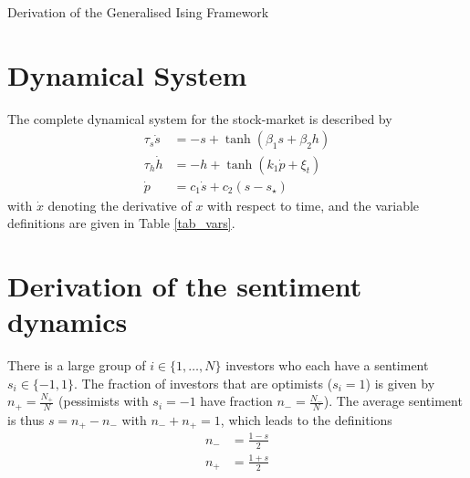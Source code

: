 \documentclass[11pt]{article}
\begin{document}
\begin{center}
\huge
Derivation of the Generalised Ising Framework
\end{center}

\section{Dynamical System}
The complete dynamical system for the stock-market is described by
\begin{subequations}
\begin{align}
\tau_s \dot{s}&=-s + \tanh( \beta_1 s + \beta_2 h) \label{eq_sentiment}\\
\tau_h \dot{h}&=-h + \tanh(k_1 \dot{p} + \xi_t)\label{eq_info}\\
\dot{p}&=c_1 \dot{s} + c_2 (s - s_\star)\label{eq_price}
\end{align}
\end{subequations}
with $\dot{x}$ denoting the derivative of $x$ with respect to time, and the variable definitions are given in Table \ref{tab_vars}.



\section{Derivation of the sentiment dynamics}

There is a large group of $i\in\{1,\dots,N\}$ investors who each have a sentiment $s_i\in\{-1,1\}$. The fraction of investors that are optimists ($s_i=1$) is given by $n_+=\frac{N_+}{N}$ (pessimists with $s_i=-1$ have fraction $n_-=\frac{N_-}{N}$).
The average sentiment is thus $s=n_+ - n_-$ with $n_- + n_+ = 1$, which leads to the definitions
\begin{subequations}\label{eq_n_to_s}
\begin{align}
n_- &= \frac{1-s}{2} \\
n_+ &= \frac{1+s}{2}
\end{align}
\end{subequations}
\end{document}
